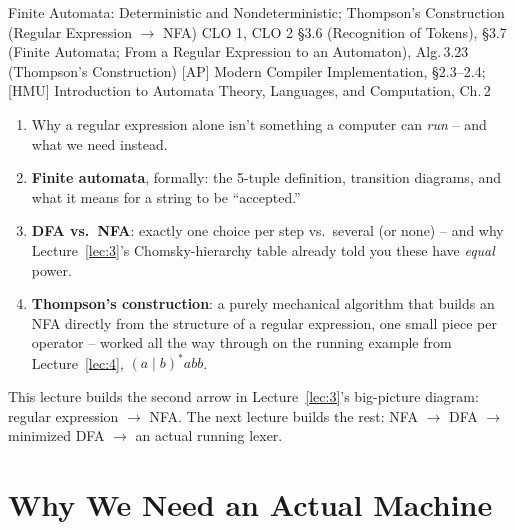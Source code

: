 \documentclass[full-course-notes.tex]{subfiles}
\begin{document}
  {Finite Automata: Deterministic and Nondeterministic; Thompson's Construction (Regular
   Expression $\to$ NFA)}
  {CLO 1, CLO 2}
  {\S3.6 (Recognition of Tokens), \S3.7 (Finite Automata; From a Regular Expression to an
   Automaton), Alg.\,3.23 (Thompson's Construction)}
  {[AP] Modern Compiler Implementation, \S2.3--2.4; [HMU] Introduction to Automata Theory,
   Languages, and Computation, Ch.\,2}
\setcounter{section}{0}
\makelecturetitle


\begin{coreidea}
\begin{enumerate}
  \item Why a regular expression alone isn't something a computer can \emph{run} -- and what
  we need instead.
  \item \textbf{Finite automata}, formally: the 5-tuple definition, transition diagrams, and
  what it means for a string to be ``accepted.''
  \item \textbf{DFA vs.\ NFA}: exactly one choice per step vs.\ several (or none) -- and why
  Lecture~\ref{lec:3}'s Chomsky-hierarchy table already told you these have \emph{equal} power.
  \item \textbf{Thompson's construction}: a purely mechanical algorithm that builds an NFA
  directly from the structure of a regular expression, one small piece per operator -- worked
  all the way through on the running example from Lecture~\ref{lec:4}, $(a\mid b)^{*}abb$.
\end{enumerate}
This lecture builds the second arrow in Lecture~\ref{lec:3}'s big-picture diagram: regular
expression $\to$ NFA. The next lecture builds the rest: NFA $\to$ DFA $\to$ minimized DFA
$\to$ an actual running lexer.
\end{coreidea}

\section{Why We Need an Actual Machine}
\label{sec:l5-why-a-machine}
\end{document}
